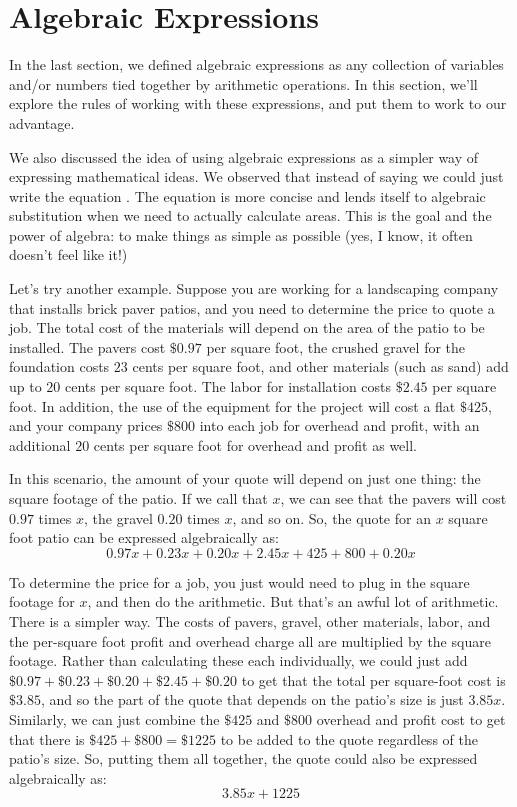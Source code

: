 %
%

\section{Algebraic Expressions}
\label{AlgebraicExpressions}

In the last section, we defined algebraic expressions as any collection of variables and/or numbers tied together by arithmetic operations. In this section, we’ll explore the rules of working with these expressions, and put them to work to our advantage.

We also discussed the idea of using algebraic expressions as a simpler way of expressing mathematical ideas. We observed that instead of saying  we could just write the equation . The equation is more concise and lends itself to algebraic substitution when we need to actually calculate areas. This is the goal and the power of algebra: to make things as simple as possible (yes, I know, it often doesn’t feel like it!)

Let’s try another example. Suppose you are working for a landscaping company that installs brick paver patios, and you need to determine the price to quote a job. The total cost of the materials will depend on the area of the patio to be installed. The pavers cost $\$0.97$ per square foot, the crushed gravel for the foundation costs $23$ cents per square foot, and other materials (such as sand) add up to $20$ cents per square foot. The labor for installation costs $\$2.45$ per square foot. In addition, the use of the equipment for the project will cost a flat $\$425$, and your company prices $\$800$ into each job for overhead and profit, with an additional $20$ cents per square foot for overhead and profit as well.

In this scenario, the amount of your quote will depend on just one thing: the square footage of the patio. If we call that $x$, we can see that the pavers will cost $0.97$ times $x$, the gravel $0.20$ times $x$, and so on. So, the quote for an $x$ square foot patio can be expressed algebraically as:
$$0.97x+0.23x+0.20x+2.45x+425+800+0.20x$$

To determine the price for a job, you just would need to plug in the square footage for $x$, and then do the arithmetic. But that’s an awful lot of arithmetic.  There is a simpler way. The costs of pavers, gravel, other materials, labor, and the per-square foot profit and overhead charge all are multiplied by the square footage. Rather than calculating these each individually, we could just add $\$0.97+\$0.23+\$0.20+\$2.45+\$0.20$ to get that the total per square-foot cost is $\$3.85$, and so the part of the quote that depends on the patio’s size is just $3.85x$. Similarly, we can just combine the $\$425$ and $\$800$ overhead and profit cost to get that there is $\$425+\$800=\$1225$ to be added to the quote regardless of the patio’s size. So, putting them all together, the quote could also be expressed algebraically as:
$$3.85x+1225$$

